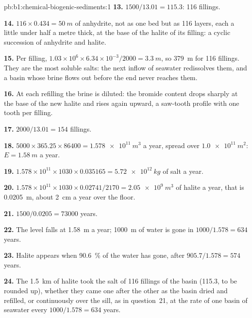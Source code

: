 \begin{solution}{pb:b1:chemical-biogenic-sediments:1}
\textbf{13.} $1500/13.01 = 115.3$: 116 fillings.

\textbf{14.} $116\times0.434 = \qty{50}{m}$ of anhydrite, not as one bed but as
116 layers, each a little under half a metre thick, at the base of the halite of
its filling: a cyclic succession of anhydrite and halite.

\textbf{15.} Per filling, $1.03\times10^6\times6.34\times10^{-3}/2000 =
\qty{3.3}{m}$, so \qty{379}{m} for 116 fillings. They are the most soluble
salts: the next inflow of seawater redissolves them, and a basin whose brine
flows out before the end never reaches them.

\textbf{16.} At each refilling the brine is diluted: the bromide content drops
sharply at the base of the new halite and rises again upward, a saw-tooth
profile with one tooth per filling.

\textbf{17.} $2000/13.01 = 154$ fillings.

\textbf{18.} $5000\times365.25\times86400 = \qty{1.578e11}{m^3}$ a year, spread
over $\qty{1.0e11}{m^2}$: $E = \qty{1.58}{m}$ a year.

\textbf{19.} $1.578\times10^{11}\times1030\times0.035165 = \qty{5.72e12}{kg}$ of
salt a year.

\textbf{20.} $1.578\times10^{11}\times1030\times0.02741/2170 =
\qty{2.05e9}{m^3}$ of halite a year, that is \qty{0.0205}{m}, about \qty{2}{cm}
a year over the floor.

\textbf{21.} $1500/0.0205 = \num{73000}$ years.

\textbf{22.} The level falls at \qty{1.58}{m} a year; \qty{1000}{m} of water is
gone in $1000/1.578 = 634$ years.

\textbf{23.} Halite appears when \qty{90.6}{\%} of the water has gone, after
$905.7/1.578 = 574$ years.

\textbf{24.} The \qty{1.5}{km} of halite took the salt of 116 fillings of the
basin (115.3, to be rounded up), whether they came one after the other as the
basin dried and refilled, or continuously over the sill, as in
question~21, at the rate of one basin of seawater every
$1000/1.578 = 634$ years.
\end{solution}
